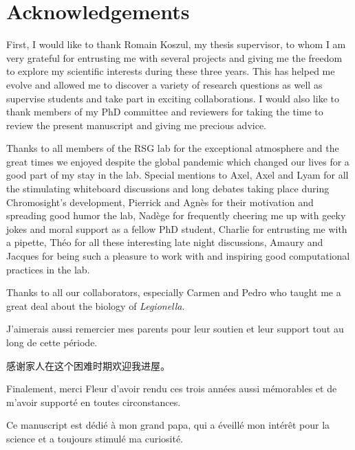 %
\chapter*{Acknowledgements}
\label{sec:acknowledgements}
\vspace*{-10mm}

First, I would like to thank Romain Koszul, my thesis supervisor, to whom I am very grateful for entrusting me with several projects and giving me the freedom to explore my scientific interests during these three years. This has helped me evolve and allowed me to discover a variety of research questions as well as supervise students and take part in exciting collaborations. I would also like to thank members of my PhD committee and reviewers for taking the time to review the present manuscript and giving me precious advice.

Thanks to all members of the RSG lab for the exceptional atmosphere and the great times we enjoyed despite the global pandemic which changed our lives for a good part of my stay in the lab. Special mentions to Axel, Axel and Lyam for all the stimulating whiteboard discussions and long debates taking place during Chromosight's development, Pierrick and Agnès for their motivation and spreading good humor the lab, Nadège for frequently cheering me up with geeky jokes and moral support as a fellow PhD student, Charlie for entrusting me with a pipette, Théo for all these interesting late night discussions, Amaury and Jacques for being such a pleasure to work with and inspiring good computational practices in the lab.

Thanks to all our collaborators, especially Carmen and Pedro who taught me a great deal about the biology of \textit{Legionella}.

J'aimerais aussi remercier mes parents pour leur soutien et leur support tout au long de cette période.
\begin{CJK*}{UTF8}{gbsn}
感谢家人在这个困难时期欢迎我进屋。
\end{CJK*}
Finalement, merci Fleur d'avoir rendu ces trois années aussi mémorables et de m'avoir supporté en toutes circonstances.

Ce manuscript est dédié à mon grand papa, qui a éveillé mon intérêt pour la science et a toujours stimulé ma curiosité.

